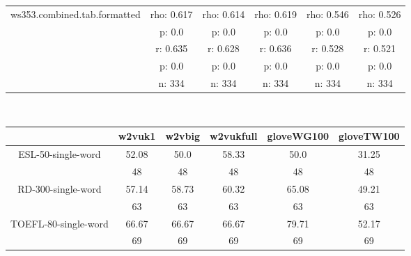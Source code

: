 \documentclass{article}
\begin{document}
\begin{tabular}{cccccc|}
\hline
\multicolumn{1}{|c|}{\multirow{5}{*}{ws353.combined.tab.formatted}} & rho: 0.617 & rho: 0.614 & rho: 0.619 & rho: 0.546 & rho: 0.526 \\
\multicolumn{1}{|c|}{} & p: 0.0 & p: 0.0 & p: 0.0 & p: 0.0 & p: 0.0 \\
\multicolumn{1}{|c|}{} & r: 0.635 & r: 0.628 & r: 0.636 & r: 0.528 & r: 0.521 \\
\multicolumn{1}{|c|}{} & p: 0.0 & p: 0.0 & p: 0.0 & p: 0.0 & p: 0.0 \\
\multicolumn{1}{|c|}{} & n: 334 & n: 334 & n: 334 & n: 334 & n: 334 \\
\hline
\end{tabular}\\
\begin{tabular}{cccccc|}\cline{2-6}
&\multicolumn{1}{|c}{w2vuk1} & w2vbig & w2vukfull & gloveWG100 & gloveTW100 \\\hline
\multicolumn{1}{|c|}{\multirow{2}{*}{ESL-50-single-word}} & 52.08 & 50.0 & 58.33 & 50.0 & 31.25 \\
\multicolumn{1}{|c|}{} & 48 & 48 & 48 & 48 & 48 \\
\hline
\multicolumn{1}{|c|}{\multirow{2}{*}{RD-300-single-word}} & 57.14 & 58.73 & 60.32 & 65.08 & 49.21 \\
\multicolumn{1}{|c|}{} & 63 & 63 & 63 & 63 & 63 \\
\hline
\multicolumn{1}{|c|}{\multirow{2}{*}{TOEFL-80-single-word}} & 66.67 & 66.67 & 66.67 & 79.71 & 52.17 \\
\multicolumn{1}{|c|}{} & 69 & 69 & 69 & 69 & 69 \\
\hline
\end{tabular}\\
\end{document}

